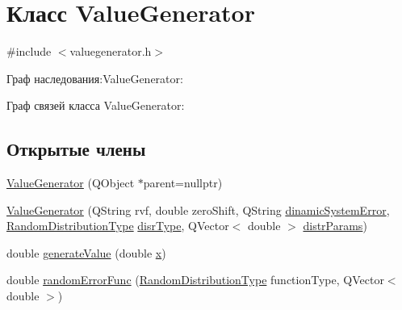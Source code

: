 \hypertarget{class_value_generator}{}\section{Класс Value\+Generator}
\label{class_value_generator}


{\ttfamily \#include $<$valuegenerator.\+h$>$}



Граф наследования\+:Value\+Generator\+:


Граф связей класса Value\+Generator\+:
\subsection*{Открытые члены}
\begin{DoxyCompactItemize}
\item 
\hyperlink{class_value_generator_a537f79ef495f29177ead85663747b249}{Value\+Generator} (Q\+Object $\ast$parent=nullptr)
\item 
\hyperlink{class_value_generator_aadc21f6d0fea326294742d8e28cf5816}{Value\+Generator} (Q\+String rvf, double zero\+Shift, Q\+String \hyperlink{class_value_generator_ac6113fdaf5766febc4900b2043c07f95}{dinamic\+System\+Error}, \hyperlink{_random_types_8h_ad7b55c73a22b009b1551ea87b0955a60}{Random\+Distribution\+Type} \hyperlink{class_value_generator_a876b8fbdbf50aa645995ffb9b8305696}{disr\+Type}, Q\+Vector$<$ double $>$ \hyperlink{class_value_generator_a3fe2f55de9b617fdec635bca5518c027}{distr\+Params})
\item 
double \hyperlink{class_value_generator_abb8134945ee903005e52934aae8fcbd2}{generate\+Value} (double \hyperlink{class_value_generator_a29306396cd47ae72e36c29781ec9d60d}{x})
\item 
double \hyperlink{class_value_generator_a87e54f9bff53072f70c89cc1490dbd4e}{random\+Error\+Func} (\hyperlink{_random_types_8h_ad7b55c73a22b009b1551ea87b0955a60}{Random\+Distribution\+Type} function\+Type, Q\+Vector$<$ double $>$)
\end{DoxyCompactItemize}
